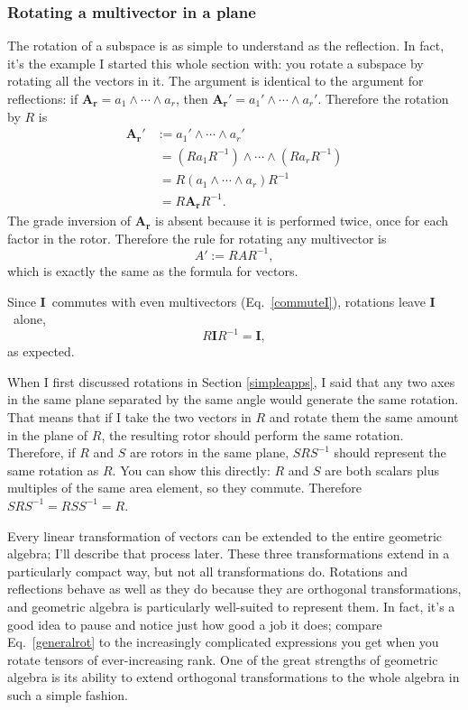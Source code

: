 \documentclass{utarticle}
\newcommand{\bl}[1]{\ensuremath{\bm{#1}}}
\newcommand{\I}{\bl{I}}
\DeclareMathOperator{\out}{\wedge}
\begin{document}
\subsubsection{Rotating a multivector in a plane}
 
The rotation of a subspace is as simple to understand as the reflection.  In fact, it's the
example I started this whole section with: you rotate a subspace by rotating all the 
vectors in it.  The argument is identical to the argument for reflections: if $\bl{A_r} =  
a_1 \out \dotsb \out a_r$, then $\bl{A_r}' = a_1' \out \dotsb \out a_r'$.  Therefore the 
rotation by $R$ is
\begin{align}
\bl{A_r}' & := a_1' \out \dotsb \out a_r' \nonumber \\
 & \ = \left(R a_1 R^{-1}\right) \out \dotsb \out \left(R a_r R^{-1}\right) \nonumber \\
 & \ = R (a_1 \out \dotsb \out a_r) R^{-1} \nonumber \\
 & \ = R \bl{A_r} R^{-1}.
\end{align}
The grade inversion of \bl{A_r} is absent because it is performed twice, once for each 
factor in the rotor.  Therefore the rule for rotating any multivector is
\begin{equation} A' := R A R^{-1}, \label{generalrot} \end{equation} 
which is exactly the same as the formula for vectors.

Since \I\ commutes with even multivectors (Eq.~\eqref{commuteI}), rotations leave \I\ alone,
\begin{equation} R \I R^{-1} = \I, \end{equation}
as expected.

When I first discussed rotations in Section \ref{simpleapps}, I said that any two axes in the
same plane separated by the same angle would generate the same rotation.  That 
means that if I take the two vectors in $R$ and rotate them the same amount in the plane 
of $R$, the resulting rotor should perform the same rotation.  Therefore, if $R$ and $S$ are 
rotors in the same plane, $S R S^{-1}$ should represent the same rotation as $R$.  You can
show this directly:  $R$ and $S$ are both scalars plus multiples of the same area element, so 
they commute.  Therefore $S R S^{-1} = R S S^{-1} = R$.  

Every linear transformation of vectors can be extended to the entire geometric
algebra; I'll describe that process later.  These three transformations extend 
in a particularly compact way, but not all transformations do.  Rotations and reflections
behave as well as they do because they are orthogonal transformations, and 
geometric algebra is particularly well-suited to represent them.  In fact, it's a good 
idea to pause and notice just how good a job it does; compare Eq.~\eqref{generalrot} 
to the increasingly complicated expressions you get when
you rotate tensors of ever-increasing rank.  One of the great strengths
of geometric algebra is its ability to extend orthogonal transformations to the whole
algebra in such a simple fashion.
\end{document}
